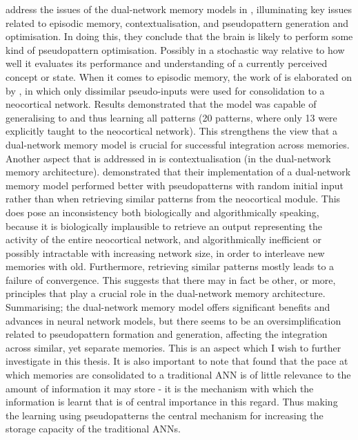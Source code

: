 \cite{French2001} address the issues of the dual-network memory models in \citep{French1997, Ans1997}, illuminating key issues related to episodic memory, contextualisation, and pseudopattern generation and optimisation. In doing this, they conclude that the brain is likely to perform some kind of pseudopattern optimisation. Possibly in a stochastic way relative to how well it evaluates its performance and understanding of a currently perceived concept or state. When it comes to episodic memory, the work of \cite{Ans2000} is elaborated on by \cite{French2001}, in which only dissimilar pseudo-inputs were used for consolidation to a neocortical network. Results demonstrated that the model was capable of generalising to and thus learning all patterns (20 patterns, where only 13 were explicitly taught to the neocortical network). This strengthens the view that a dual-network memory model is crucial for successful integration across memories. Another aspect that is addressed in \citep{French2001} is contextualisation (in the dual-network memory architecture). \cite{Ans2000} demonstrated that their implementation of a dual-network memory model performed better with pseudopatterns with random initial input rather than when retrieving similar patterns from the neocortical module. This does pose an inconsistency both biologically and algorithmically speaking, because it is biologically implausible to retrieve an output representing the activity of the entire neocortical network, and algorithmically inefficient or possibly intractable with increasing network size, in order to interleave new memories with old. Furthermore, retrieving similar patterns mostly leads to a failure of convergence. This suggests that there may in fact be other, or more, principles that play a crucial role in the dual-network memory architecture. Summarising; the dual-network memory model offers significant benefits and advances in neural network models, but there seems to be an oversimplification related to pseudopattern formation and generation, affecting the integration across similar, yet separate memories. This is an aspect which I wish to further investigate in this thesis.
It is also important to note that \citep{French2001} found that the pace at which memories are consolidated to a traditional ANN is of little relevance to the amount of information it may store - it is the mechanism with which the information is learnt that is of central importance in this regard. Thus making the learning using pseudopatterns the central mechanism for increasing the storage capacity of the traditional ANNs.

